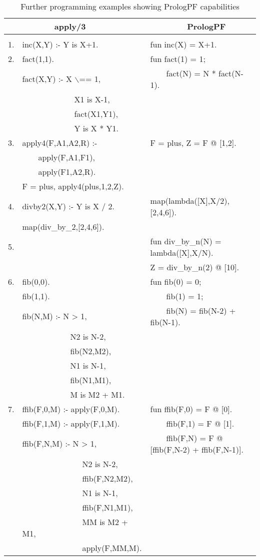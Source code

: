 \begin{table}[htbp]
{\footnotesize
\tt
\begin{tabular}{| l | l | l |}
\hline
   &~~~~~~~apply/3                &~~~~~~~~PrologPF \\
\hline
& & \\
1. &inc(X,Y) :- Y is X+1.            &fun inc(X) = X+1.\\
2. &fact(1,1).                       &fun fact(1) = 1;\\
   &fact(X,Y) :- X $\backslash$== 1, &~~~~fact(N) = N * fact(N-1).\\
   &~~~~~~~~~~~~~X1 is X-1,       &\\
   &~~~~~~~~~~~~~fact(X1,Y1),     &\\
   &~~~~~~~~~~~~~Y is X * Y1.     &\\
3. &apply4(F,A1,A2,R) :-          &F = plus, Z = F @ [1,2].\\
   &~~~~apply(F,A1,F1),           &\\
   &~~~~apply(F1,A2,R).           &\\
   &F = plus, apply4(plus,1,2,Z). &\\
4. &divby2(X,Y) :- Y is X / 2.    &map(lambda([X],X/2),[2,4,6]).\\
   &map(div\_{}by\_{}2,[2,4,6]).  &\\
5. &                              &fun div\_{}by\_{}n(N) = lambda([X],X/N).\\
   &                              &Z = div\_{}by\_{}n(2) @ [10].\\
6. &fib(0,0).                     &fun fib(0) = 0;\\
   &fib(1,1).                     &~~~~fib(1) = 1;\\
   &fib(N,M) :- N > 1,            &~~~~fib(N) = fib(N-2) + fib(N-1).\\
   &~~~~~~~~~~~~N2 is N-2,        &\\
   &~~~~~~~~~~~~fib(N2,M2),       &\\
   &~~~~~~~~~~~~N1 is N-1,        &\\
   &~~~~~~~~~~~~fib(N1,M1),       &\\
   &~~~~~~~~~~~~M is M2 + M1.     &\\
7. &ffib(F,0,M) :- apply(F,0,M).  &fun ffib(F,0) = F @ [0].\\
   &ffib(F,1,M) :- apply(F,1,M).  &~~~~ffib(F,1) = F @ [1].\\
   &ffib(F,N,M) :- N > 1,         &~~~~ffib(F,N) = F @ [ffib(F,N-2) + ffib(F,N-1)].\\
   &~~~~~~~~~~~~~~~N2 is N-2,     &\\
   &~~~~~~~~~~~~~~~ffib(F,N2,M2), &\\
   &~~~~~~~~~~~~~~~N1 is N-1,     &\\
   &~~~~~~~~~~~~~~~ffib(F,N1,M1), &\\
   &~~~~~~~~~~~~~~~MM is M2 + M1, &\\
   &~~~~~~~~~~~~~~~apply(F,MM,M). &\\
\hline
\end{tabular}
}
\label{prologpf_syntax_advantages}
\caption{Further programming examples showing PrologPF capabilities}
\end{table}

